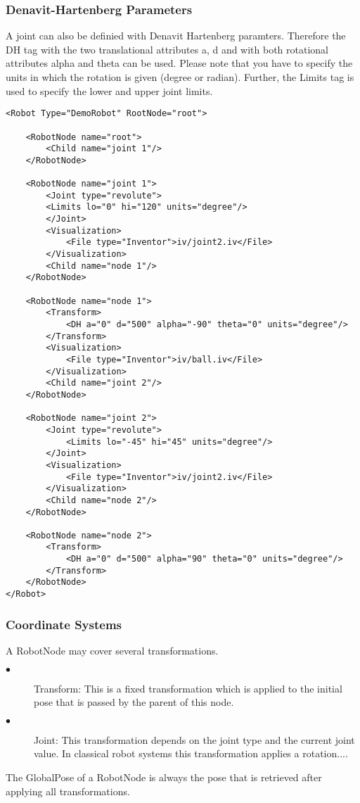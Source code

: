 \subsubsection*{Denavit-Hartenberg Parameters}
\par
A joint can also be definied with Denavit Hartenberg paramters. Therefore the DH tag with the two translational attributes a, d and with both rotational attributes alpha and theta can be used. Please note that you have to specify the units in which the rotation is given (degree or radian). Further, the Limits tag is used to specify the lower and upper joint limits. 
\begin{lstlisting}
<Robot Type="DemoRobot" RootNode="root">

    <RobotNode name="root">
        <Child name="joint 1"/>
    </RobotNode>

    <RobotNode name="joint 1">
        <Joint type="revolute">
        <Limits lo="0" hi="120" units="degree"/>
        </Joint>
        <Visualization>
            <File type="Inventor">iv/joint2.iv</File>
        </Visualization>
        <Child name="node 1"/>
    </RobotNode>

    <RobotNode name="node 1">
        <Transform>
            <DH a="0" d="500" alpha="-90" theta="0" units="degree"/>
        </Transform>
        <Visualization>
            <File type="Inventor">iv/ball.iv</File>
        </Visualization>
        <Child name="joint 2"/>
    </RobotNode>

    <RobotNode name="joint 2">
        <Joint type="revolute">
            <Limits lo="-45" hi="45" units="degree"/>
        </Joint>
        <Visualization>
            <File type="Inventor">iv/joint2.iv</File>
        </Visualization>
        <Child name="node 2"/>
    </RobotNode>

    <RobotNode name="node 2">
        <Transform>
            <DH a="0" d="500" alpha="90" theta="0" units="degree"/>
        </Transform>
    </RobotNode>
</Robot>
\end{lstlisting}
\par
\subsubsection*{Coordinate Systems}
\par
A RobotNode may cover several transformations.
\par
\begin{description}
  \item[$\bullet$]Transform: This is a fixed transformation which is applied to the initial pose that is passed by the parent of this node.
    \item[$\bullet$] Joint: This transformation depends on the joint type and the current joint value. In classical robot systems this transformation applies a rotation....
\end{description}
   \par
   The GlobalPose of a RobotNode is always the pose that is retrieved after applying all transformations. 
   \par
